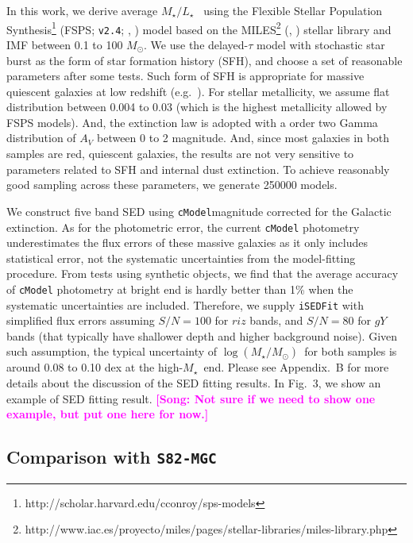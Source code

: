 \documentclass[preprint]{aastex}
\def\msun{$M_\odot$}
\def\cmodel{\texttt{cModel}}
\def\logms{{$\log (M_{\star}/M_{\odot})$}~}
\def\mstar{{$M_{\star}$}~}
\def\m2l{{$M_{\star}/L_{\star}$}~}
\newcommand{\song}[1]{\textcolor{magenta}{\textbf{[Song: #1]}}}
\begin{document}
\begin{CJK*}{UTF8}{gbsn}
    In this work, we derive average \m2l using the Flexible Stellar Population 
    Synthesis\footnote{http://scholar.harvard.edu/cconroy/sps-models}
    (FSPS; \texttt{v2.4}; \citealt{FSPS}, \citealt{Conroy2010}) model based on 
    the MILES\footnote{http://www.iac.es/proyecto/miles/pages/stellar-libraries/miles-library.php}
    (\citealt{MILES1}, \citealt{MILES2}) stellar library and \citet{Chabrier2003} 
    IMF between 0.1 to 100 \msun. 
    We use the delayed-$\tau$ model with stochastic star burst as the form of 
    star formation history (SFH), and choose a set of reasonable parameters 
    after some tests.  
    Such form of SFH is appropriate for massive quiescent galaxies at low redshift 
    (e.g.\ \citealt{Kauffmann2003}). 
    For stellar metallicity, we assume flat distribution between 0.004 to 
    0.03 (which is the highest metallicity allowed by FSPS models).  
    And, the \citet{Calzetti2000} extinction law is adopted with a order two 
    Gamma distribution of $A_{V}$ between 0 to 2 magnitude.
    And, since most galaxies in both samples are red, quiescent galaxies, the 
    results are not very sensitive to parameters related to SFH and internal 
    dust extinction. 
    To achieve reasonably good sampling across these parameters, we generate 
    250000 models. 
    
    We construct five band SED using \cmodel magnitude corrected for the Galactic 
    extinction. 
    As for the photometric error, the current \texttt{cModel} photometry 
    underestimates the flux errors of these massive galaxies as it only includes 
    statistical error, not the systematic uncertainties from the model-fitting procedure.  
    From tests using synthetic objects, we find that the average accuracy of 
    \texttt{cModel} photometry at bright end is hardly better than 1\% when the 
    systematic uncertainties are included. 
    Therefore, we supply \texttt{iSEDFit} with simplified flux errors assuming 
    $S/N = 100$ for $riz$ bands, and $S/N = 80$ for $gY$ bands (that typically 
    have shallower depth and higher background noise).  
    Given such assumption, the typical uncertainty of \logms for both samples is 
    around 0.08 to 0.10 dex at the high-\mstar end. 
    Please see Appendix.~B for more details about the discussion of the SED fitting
    results.  
    In Fig.~3, we show an example of SED fitting result. 
    \song{Not sure if we need to show one example, but put one here for now.}
        
\subsection{Comparison with \texttt{S82-MGC}}


\end{CJK*}
\end{document}
